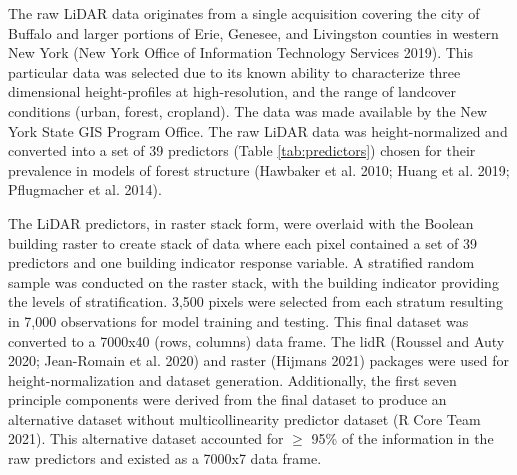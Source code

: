 \documentclass[]{elsarticle} %
\begin{document}
The raw LiDAR data originates from a single acquisition covering the city
of Buffalo and larger portions of Erie, Genesee, and Livingston counties in
western New York (New York Office of Information Technology Services 2019).
This particular data was selected due to its known ability to characterize
three dimensional height-profiles at high-resolution, and the range of
landcover conditions (urban, forest, cropland).
The data was made available by the New York State GIS Program Office.
The raw LiDAR data was height-normalized and converted into a set of 39
predictors (Table \ref{tab:predictors}) chosen for their prevalence in models
of forest structure (Hawbaker et al. 2010; Huang et al. 2019; Pflugmacher et al. 2014).

The LiDAR predictors, in raster stack form, were overlaid with the Boolean
building raster to create stack of data where each pixel contained a set of 39
predictors and one building indicator response variable.
A stratified random sample was conducted on the raster stack, with the building
indicator providing the levels of stratification.
3,500 pixels were selected from each stratum resulting in 7,000 observations for model training and testing.
This final dataset was converted to a 7000x40 (rows, columns) data frame.
The lidR (Roussel and Auty 2020; Jean-Romain et al. 2020) and raster (Hijmans 2021) packages were used for
height-normalization and dataset generation.
Additionally, the first seven principle components were derived from the final dataset to produce an alternative dataset without multicollinearity predictor
dataset (R Core Team 2021).
This alternative dataset accounted for \(\ge\) 95\% of the information in the raw predictors and existed as a 7000x7 data frame.
\end{document}

